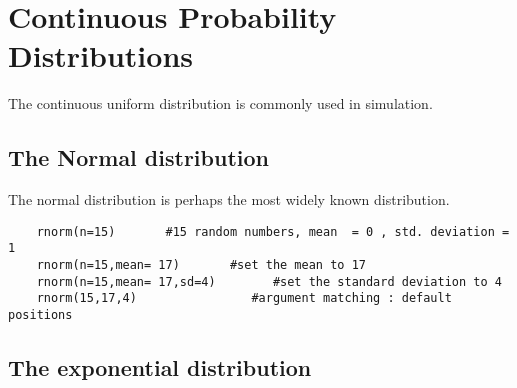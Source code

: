 \section{Continuous Probability Distributions}


The continuous uniform distribution is commonly used in simulation.
\subsection{The Normal distribution}

The normal distribution is perhaps the most widely known distribution.
\begin{framed}
	\begin{verbatim}
	rnorm(n=15)       #15 random numbers, mean  = 0 , std. deviation = 1
	rnorm(n=15,mean= 17)       #set the mean to 17
	rnorm(n=15,mean= 17,sd=4)        #set the standard deviation to 4
	rnorm(15,17,4)                #argument matching : default positions
	\end{verbatim}
\end{framed} 






\subsection{The exponential distribution}



